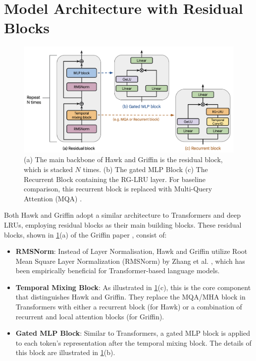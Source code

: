 \documentclass[12pt,a4paper]{report}
\begin{document}
\section{Model Architecture with Residual Blocks}

\begin{figure}[ht]
    \centerline{\includegraphics[scale=0.4]{C5.3.1_ResBlock_Arch.png}}
    \caption{(a) The main backbone of Hawk and Griffin is the residual block, which is stacked $N$ times. (b) The gated MLP Block (c) The Recurrent Block containing the RG-LRU layer. For baseline comparison, this recurrent block is replaced with Multi-Query Attention (MQA) \cite{mqa}.}
    \label{hg_resblock_arch}
\end{figure}

Both Hawk and Griffin adopt a similar architecture to Transformers and deep LRUs, employing residual blocks as their main building blocks. These residual blocks, shown in \ref{hg_resblock_arch}(a) of the Griffin paper \cite{hawkgriffin}, consist of:
\begin{itemize}
    \item \textbf{RMSNorm}: Instead of Layer Normalisation, Hawk and Griffin utilize Root Mean Square Layer Normalization (RMSNorm) by Zhang et al. \cite{llama}, which has been empirically beneficial for Transformer-based language models.
    \item \textbf{Temporal Mixing Block}: As illustrated in \ref{hg_resblock_arch}(c), this is the core component that distinguishes Hawk and Griffin. They replace the MQA/MHA block in Transformers with either a recurrent block (for Hawk) or a combination of recurrent and local attention blocks (for Griffin).
    \item \textbf{Gated MLP Block}: Similar to Transformers, a gated MLP block is applied to each token's representation after the temporal mixing block. The details of this block are illustrated in \ref{hg_resblock_arch}(b).
\end{itemize}
\end{document}
